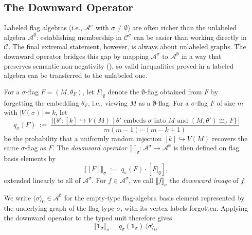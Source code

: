 \documentclass{article}
\begin{document}
\subsection{The Downward Operator}
\label{sec:background-downward}
Labeled flag algebras (i.e., $\mathcal{A}^\sigma$ with $\sigma \neq \emptyset$) are often
richer than the unlabeled algebra $\mathcal{A}^\emptyset$: establishing membership
in $\mathcal{C}^\sigma$ can be easier than working directly in $\mathcal{C}$.
The final extremal statement, however, is always about unlabeled graphs.
The downward operator bridges this gap by mapping $\mathcal{A}^\sigma$ to
$\mathcal{A}^\emptyset$ in a way that preserves semantic non-negativity
(), so valid inequalities proved in a labeled algebra
can be transferred to the unlabeled one.

For a $\sigma$-flag $F = (M, \theta_F)$, let $F|_\emptyset$ denote the
$\emptyset$-flag obtained from $F$ by forgetting the embedding $\theta_F$,
i.e., viewing $M$ as a $\emptyset$-flag.
For a $\sigma$-flag $F$ of size $m$ with $|V(\sigma)|=k$, let
\[
  q_\sigma(F)
  \;:=\;
  \frac{
    \bigl|\{\theta' : [k]\hookrightarrow V(M)
       \mid \theta' \text{ embeds }\sigma\text{ into }M
       \text{ and } (M,\theta')\cong_\sigma F\}\bigr|}
       {m(m-1)\cdots(m-k+1)}
\]
be the probability that a uniformly random injection $[k]\hookrightarrow V(M)$
recovers the same $\sigma$-flag as $F$.
The \emph{downward operator}
$\llbracket\cdot\rrbracket_\sigma:\mathcal{A}^\sigma\to\mathcal{A}^\emptyset$
is then defined on flag basis elements by
\[
  \llbracket [F] \rrbracket_\sigma
  \;:=\;
  q_\sigma(F)\cdot [F|_\emptyset],
\]
extended linearly to all of $\mathcal{A}^\sigma$.
For $f\in\mathcal{A}^\sigma$, we call
$\llbracket f\rrbracket_\sigma$ the \emph{downward image} of $f$.

We write $\langle\sigma\rangle_0\in\mathcal{A}^\emptyset$ for the empty-type
flag-algebra basis element represented by the underlying graph of the flag type
$\sigma$, with its vertex labels forgotten.  Applying the downward operator to
the typed unit therefore gives
\[
  \llbracket \mathbf{1}_\sigma \rrbracket_\sigma
  =
  q_\sigma(\mathbf{1}_\sigma)\,\langle\sigma\rangle_0.
\]
\end{document}
